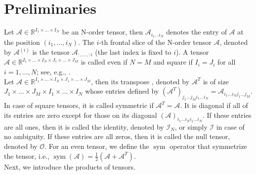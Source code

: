 \documentclass{siamltex}
\begin{document}
\section{Preliminaries}\label{sec:preliminaries}
Let $\mathcal{A}\in \mathbb{R}^{I_1\times \ldots \times I_N}$ be an N-order tensor, then $\mathcal{A}_{i_1 \ldots i_N}$ denotes the entry of $\mathcal{A}$ at the position $(i_1,\ldots,i_N)$. 
The $i$-th frontal slice of the N-order tensor $\mathcal{A}$, denoted by $\mathcal{A}^{(i)}$ is the tensor $\mathcal{A}_{:,\ldots,:i}$ (the last index is fixed to $i$). A tensor $\mathcal{A} \in \mathbb{R}^{I_1\times \ldots \times I_N \times J_1\times \ldots \times J_M}$ is called even if $N=M$ and square if $I_i=J_i$ for all $i=1,\ldots,N$; see, e.g., \cite{qi2017tensor}.\\
Let $\mathcal{A}\in \mathbb{R}^{I_1\times \ldots \times I_N\times J_1\times \ldots \times J_M}$, then its transpose \cite{qi2017tensor}, denoted by $\mathcal{A}^T$ is of size $J_1\times \ldots \times J_M \times I_1\times \ldots \times I_N$ whose entries defined by $(\mathcal{A}^T )_{j_1\dots j_M i_1\dots i_N}=\mathcal{A}_{i_1\dots i_N j_1\dots j_M}$. In case of square tensors, it is called symmetric if $\mathcal{A}^T= \mathcal{A}$. It is diagonal if all of its entries are zero except for those on its diagonal $(\mathcal{A})_{i_1\dots i_N i_1\dots i_N}$. If these entries are all ones, then it is called the identity, denoted by $\mathcal{I}_N$, or simply $\mathcal{I}$ in case of no ambiguity. If these entries are all zeros, then it is called the null tensor, denoted by $\mathcal{O}$. For an even tensor, we define the $\operatorname{sym}$ operator that symmetrize the tensor, i.e., $\operatorname{sym}(\mathcal{A})=\frac{1}{2}(\mathcal{A}+\mathcal{A}^T)$.\\
Next, we introduce the products of tensors.
\end{document}
